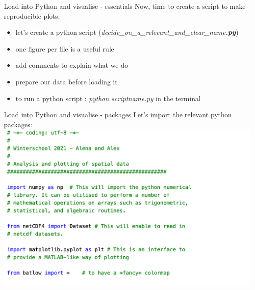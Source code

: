 \begin{frame}{\insertsectionnumber{ |} Load into Python and visualise - essentials}
    Now, time to create a script to make reproducible plots:
        \vspace{0.3cm}
    \begin{itemize}
        \item let's create a python script (\textit{decide\_on\_a\_relevant\_and\_clear\_name\textbf{.py}})
             \vspace{0.3cm}
         \item one figure per file is a useful rule
             \vspace{0.3cm}
        \item add comments to explain what we do
             \vspace{0.3cm}
        \item prepare our data before loading it
             \vspace{0.3cm}
        \item to run a python script : \textit{python scriptname.py} in the terminal
            \vspace{0.3cm}
    \end{itemize}
\end{frame}
 
 
\begin{frame}{\insertsectionnumber{ |} Load into Python and visualise - packages}
    Let's import the relevant python packages:\\
        \vspace{0.3cm}
    \hbox{\hspace{-0.8cm}\includegraphics[scale=0.35]{images/Script1_step1.png}}
\end{frame}
 
